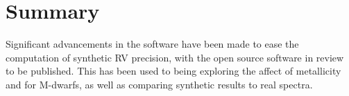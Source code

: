  
















\section{Summary}
Significant advancements in the \eniric{} software have been made to ease the computation of synthetic {RV} precision, with the open source software in review to be published.
This has been used to being exploring the affect of metallicity and \Logg{} for M-dwarfs, as well as comparing synthetic results to real spectra.

